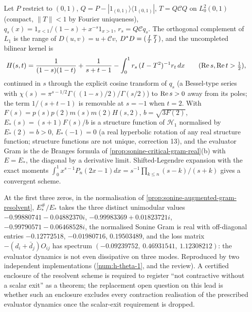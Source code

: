 \begin{proposition}
\label{prop:sonine-augmented-gram-resolvent}
Let $P$ restrict to $(0,1)$, $Q = P-|1_{(0,1)}\rangle\langle1_{(0,1)}|$, $T = Q\mathcal CQ$ on $L^2_0(0,1)$ (compact, $\|T\|<1$
by Fourier uniqueness), $q_s(x) = 1_{x<1}/(1-s)+x^{-s}1_{x>1}$, $r_s = Q\mathcal Cq_s$. The orthogonal complement of $L_1$ is
the range of $D(u,v) = u+\mathcal Cv$, $D^{*}D = \begin{psmallmatrix}I&T\\T&I\end{psmallmatrix}$, and the uncompleted
bilinear kernel is
\[
H(s,t) = \frac1{(1-s)(1-t)}+\frac1{s+t-1}-\int_0^1r_s\,(I-T^2)^{-1}r_t\,dx\qquad(\operatorname{Re} s,\operatorname{Re} t>\tfrac12),
\]
continued in $s$ through the explicit cosine transform of $q_s$ (a Bessel-type series with $\chi(s) = \pi^{s-1/2}
\Gamma((1-s)/2)/\Gamma(s/2)$) to $\operatorname{Re} s>0$ away from its poles; the term $1/(s+t-1)$ is removable at $s = -1$ when
$t = 2$. With $F(s) = p(s)p(2)m(s)m(2)H(s,2)$, $b = \sqrt{3F(2)}$, $E_{*}(s) = (s+1)F(s)/b$ is a structure function of
$\mathscr H_1$ normalised by $E_{*}(2) = b>0$, $E_{*}(-1) = 0$ (a real hyperbolic rotation of any real structure function;
structure functions are not unique, correction 13), and the evaluator Gram is the de Branges formula of
\cref{prop:sonine-critical-gram-real}(b) with $E = E_{*}$, the diagonal by a derivative limit. Shifted-Legendre
expansion with the exact moments $\int_0^1x^{s-1}P_n(2x-1)dx = s^{-1}\prod_{k\le n}(s-k)/(s+k)$ gives a convergent scheme.
\end{proposition}

\begin{observation}
\label{obs:sonine-enclosure-open}
At the first three zeros, in the normalisation of \cref{prop:sonine-augmented-gram-resolvent}, $E_{*}^\#/E_{*}$ takes the
three distinct unimodular values $-0.99880741-0.04882370i$, $-0.99983369+0.01823721i$, $-0.99790571-0.06468528i$, the normalised
Sonine Gram is real with off-diagonal entries $-0.12772518$, $-0.01980716$, $0.19503489$, and the loss matrix
$-(d_i+\bar d_j)O_{ij}$ has spectrum $(-0.09239752,\ 0.46931541,\ 1.12308212)$: the evaluator dynamics is not even
dissipative on three modes. Reproduced by two independent implementations (\cref{num:h-theta-1}, and the review). A
certified enclosure of the resolvent scheme is required to register ``not contractive without a scalar exit'' as a
theorem; the replacement open question on this lead is whether such an enclosure excludes every contraction
realisation of the prescribed evaluator dynamics once the scalar-exit requirement is dropped.
\end{observation}

